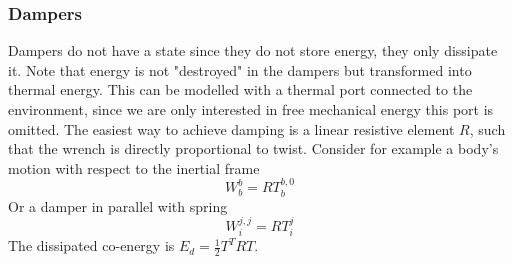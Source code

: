 \documentclass[a4paper,twoside, openright,12pt]{report}
\begin{document}
\subsubsection{Dampers}\label{SSS:Dampers}
Dampers do not have a state since they do not store energy, they only dissipate it. Note that energy is not "destroyed" in the dampers but transformed into thermal energy. This can be modelled with a thermal port connected to the environment, since we are only interested in free mechanical energy this port is omitted. The easiest way to achieve damping is a linear resistive element $R$, such that the wrench is directly proportional to twist. Consider for example a body's motion with respect to the inertial frame
\begin{equation}
	W_b^b = R T_b^{b,0}
\end{equation}
Or a damper in parallel with spring
\begin{equation}
	W_i^{j,j} = R T_i^{j}
\end{equation}
The dissipated co-energy is $E_d = \frac{1}{2}T^T R T$.
\end{document}
